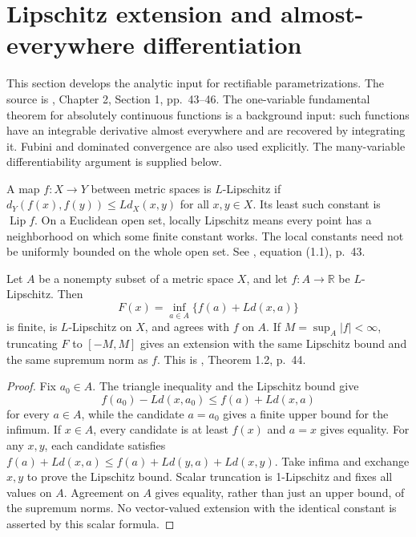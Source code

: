 \chapter{Lipschitz extension and almost-everywhere differentiation}\label{sec:lipschitz-tools}
This section develops the analytic input for rectifiable parametrizations. The source is \cite{Sim18}, Chapter 2, Section 1, pp.~43--46. The one-variable fundamental theorem for absolutely continuous functions is a background input: such functions have an integrable derivative almost everywhere and are recovered by integrating it. Fubini and dominated convergence are also used explicitly. The many-variable differentiability argument is supplied below.

\begin{definition}\label{def:lipschitz-constants}
A map $f:X\to Y$ between metric spaces is $L$-Lipschitz if $d_Y(f(x),f(y))\leq Ld_X(x,y)$ for all $x,y\in X$. Its least such constant is $\operatorname{Lip}f$. On a Euclidean open set, locally Lipschitz means every point has a neighborhood on which some finite constant works. The local constants need not be uniformly bounded on the whole open set. See \cite{Sim18}, equation (1.1), p.~43.
\end{definition}

\begin{proposition}\label{prop:mcshane-extension}
Let $A$ be a nonempty subset of a metric space $X$, and let $f:A\to\mathbb R$ be $L$-Lipschitz. Then
\[
 F(x)=\inf_{a\in A}\{f(a)+Ld(x,a)\}
\]
is finite, is $L$-Lipschitz on $X$, and agrees with $f$ on $A$. If $M=\sup_A|f|<\infty$, truncating $F$ to $[-M,M]$ gives an extension with the same Lipschitz bound and the same supremum norm as $f$. This is \cite{Sim18}, Theorem 1.2, p.~44.
\end{proposition}
\begin{proof}
Fix $a_0\in A$. The triangle inequality and the Lipschitz bound give
\[
 f(a_0)-Ld(x,a_0)\leq f(a)+Ld(x,a)
\]
for every $a\in A$, while the candidate $a=a_0$ gives a finite upper bound for the infimum. If $x\in A$, every candidate is at least $f(x)$ and $a=x$ gives equality. For any $x,y$, each candidate satisfies $f(a)+Ld(x,a)\leq f(a)+Ld(y,a)+Ld(x,y)$. Take infima and exchange $x,y$ to prove the Lipschitz bound. Scalar truncation is 1-Lipschitz and fixes all values on $A$. Agreement on $A$ gives equality, rather than just an upper bound, of the supremum norms. No vector-valued extension with the identical constant is asserted by this scalar formula.
\end{proof}

